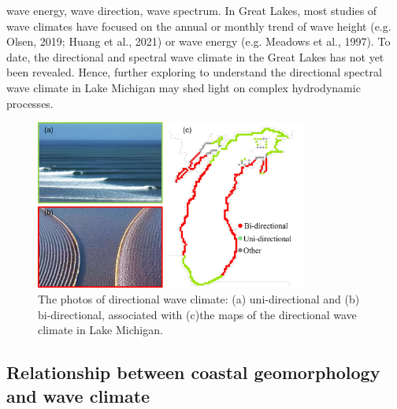 wave energy, wave direction, wave spectrum. In Great Lakes, most studies of wave climates have focused on the annual or monthly trend of wave height (e.g. Olsen, 2019; Huang et al., 2021) or wave energy (e.g. Meadows et al., 1997). To date, the directional and spectral wave climate in the Great Lakes has not yet been revealed. Hence, further exploring to understand the directional spectral wave climate in Lake Michigan may shed light on complex hydrodynamic processes.

\begin{figure}[htbp]
  \centering
  \includegraphics[width=0.8\textwidth]{chapter1/resources/figure1-4.jpg}
  \caption{The photos of directional wave climate: (a) uni-directional and (b) bi-directional, associated with (c)the maps of the directional wave climate in Lake Michigan.}
  \label{fig:fig1.4}
\end{figure}

\subsection{Relationship between coastal geomorphology and wave climate}
\label{Relationship between coastal geomorphology and wave climate}

